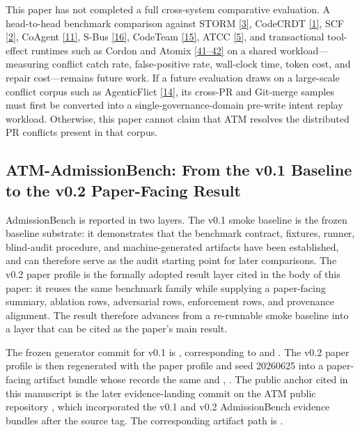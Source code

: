 \documentclass[9pt,letterpaper]{extarticle}
\begin{document}
This paper has not completed a full cross-system comparative evaluation. A head-to-head benchmark comparison against STORM \textcolor{atmLinkBlue}{\hyperlink{Item.39}{[3]}}, CodeCRDT \textcolor{atmLinkBlue}{\hyperlink{Item.37}{[1]}}, SCF \textcolor{atmLinkBlue}{\hyperlink{Item.38}{[2]}}, CoAgent \textcolor{atmLinkBlue}{\hyperlink{Item.47}{[11]}}, S-Bus \textcolor{atmLinkBlue}{\hyperlink{Item.52}{[16]}}, CodeTeam \textcolor{atmLinkBlue}{\hyperlink{Item.51}{[15]}}, ATCC \textcolor{atmLinkBlue}{\hyperlink{Item.41}{[5]}}, and transactional tool-effect runtimes such as Cordon and Atomix \textcolor{atmLinkBlue}{\hyperlink{Item.77}{[41--42]}} on a shared workload---measuring conflict catch rate, false-positive rate, wall-clock time, token cost, and repair cost---remains future work. If a future evaluation draws on a large-scale conflict corpus such as AgenticFlict \textcolor{atmLinkBlue}{\hyperlink{Item.50}{[14]}}, its cross-PR and Git-merge samples must first be converted into a single-governance-domain pre-write intent replay workload. Otherwise, this paper cannot claim that ATM resolves the distributed PR conflicts present in that corpus.

\subsection{ATM-AdmissionBench: From the v0.1 Baseline to the v0.2 Paper-Facing Result}

AdmissionBench is reported in two layers. The v0.1 smoke baseline is the frozen baseline substrate: it demonstrates that the benchmark contract, fixtures, runner, blind-audit procedure, and machine-generated artifacts have been established, and can therefore serve as the audit starting point for later comparisons. The v0.2 paper profile is the formally adopted result layer cited in the body of this paper: it reuses the same benchmark family while supplying a paper-facing summary, ablation rows, adversarial rows, enforcement rows, and provenance alignment. The result therefore advances from a re-runnable smoke baseline into a layer that can be cited as the paper's main result.

The frozen generator commit for v0.1 is \texttt{}, corresponding to \texttt{} and \texttt{}. The v0.2 paper profile is then regenerated with the paper profile and seed 20260625 into a paper-facing artifact bundle whose \texttt{} records the same \texttt{} and \texttt{}, \texttt{}. The public anchor cited in this manuscript is the later evidence-landing commit \texttt{} on the ATM public repository \texttt{}, which incorporated the v0.1 and v0.2 AdmissionBench evidence bundles after the \texttt{} source tag. The corresponding artifact path is \texttt{}.
\end{document}
